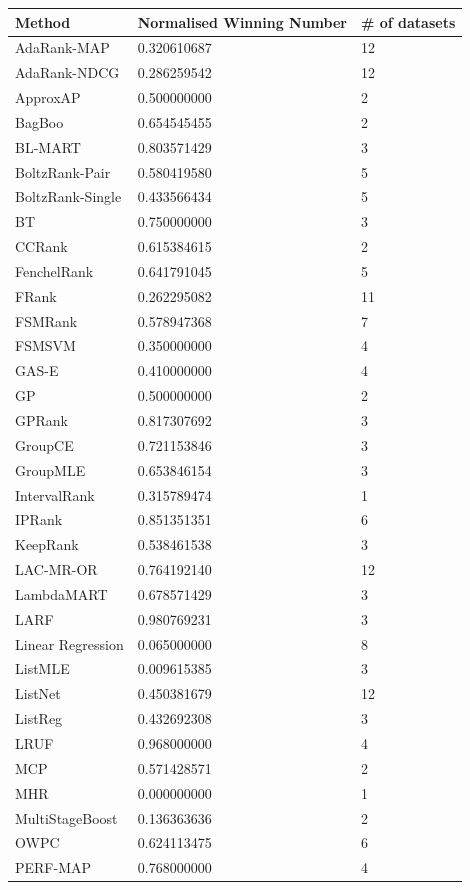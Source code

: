 \documentclass{sig-alternate-2013}
\begin{document}
\begin{table}
\begin{tabular}{l|l|l}
Method & Normalised Winning Number & \# of datasets \\
\hline
AdaRank-MAP & 0.320610687 & 12 \\ 
AdaRank-NDCG & 0.286259542 & 12 \\ 
ApproxAP & 0.500000000 & 2 \\ 
BagBoo & 0.654545455 & 2 \\ 
BL-MART & 0.803571429 & 3 \\ 
BoltzRank-Pair & 0.580419580 & 5 \\ 
BoltzRank-Single & 0.433566434 & 5 \\ 
BT & 0.750000000 & 3 \\ 
CCRank & 0.615384615 & 2 \\ 
FenchelRank & 0.641791045 & 5 \\ 
FRank & 0.262295082 & 11 \\ 
FSMRank & 0.578947368 & 7 \\ 
FSMSVM & 0.350000000 & 4 \\ 
GAS-E & 0.410000000 & 4 \\ 
GP & 0.500000000 & 2 \\ 
GPRank & 0.817307692 & 3 \\ 
GroupCE & 0.721153846 & 3 \\ 
GroupMLE & 0.653846154 & 3 \\ 
IntervalRank & 0.315789474 & 1 \\ 
IPRank & 0.851351351 & 6 \\ 
KeepRank & 0.538461538 & 3 \\ 
LAC-MR-OR & 0.764192140 & 12 \\ 
LambdaMART & 0.678571429 & 3 \\ 
LARF & 0.980769231 & 3 \\ 
Linear Regression & 0.065000000 & 8 \\ 
ListMLE & 0.009615385 & 3 \\ 
ListNet & 0.450381679 & 12 \\ 
ListReg & 0.432692308 & 3 \\ 
LRUF & 0.968000000 & 4 \\ 
MCP & 0.571428571 & 2 \\ 
MHR & 0.000000000 & 1 \\ 
MultiStageBoost & 0.136363636 & 2 \\ 
OWPC & 0.624113475 & 6 \\ 
PERF-MAP & 0.768000000 & 4 \\ 

\end{tabular}
\end{table}
\end{document}
